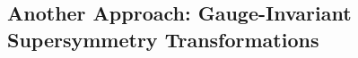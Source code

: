 
\subsection[Another Approach: Gauge-Invariant Supersymmetry Transformations]
{Another Approach: Gauge-Invariant Supersymmetry Transformations\footnotemark}

